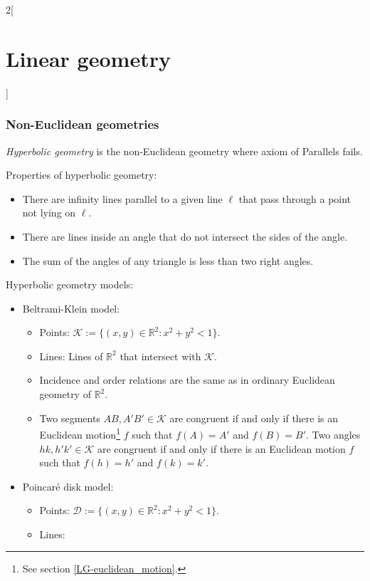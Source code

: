 \documentclass[../../../main.tex]{subfiles}
\begin{document}
\begin{multicols}{2}[\section{Linear geometry}]
\subsubsection*{Non-Euclidean geometries}
\begin{definition}
\textit{Hyperbolic geometry} is the non-Euclidean geometry where axiom of Parallels fails.
\end{definition}
\begin{prop}
Properties of hyperbolic geometry:
\begin{itemize}
    \item There are infinity lines parallel to a given line $\ell$ that pass through a point not lying on $\ell$.
    \item There are lines inside an angle that do not intersect the sides of the angle.
    \item The sum of the angles of any triangle is less than two right angles.
\end{itemize}
\end{prop}
\begin{definition}
Hyperbolic geometry models:
\begin{itemize}
    \item Beltrami-Klein model:
    \begin{itemize}
        \item Points: $\mathcal{K}:=\{(x,y)\in\mathbb{R}^2:x^2+y^2<1\}$.
        \item Lines: Lines of $\mathbb{R}^2$ that intersect with $\mathcal{K}$.
        \item Incidence and order relations are the same as in ordinary Euclidean geometry of $\mathbb{R}^2$.
        \item Two segments $AB,A'B'\in\mathcal{K}$ are congruent if and only if there is an Euclidean motion\footnote{See section \ref{LG-euclidean_motion}.} $f$ such that $f(A)=A'$ and $f(B)=B'$. Two angles $hk,h'k'\in\mathcal{K}$ are congruent if and only if there is an Euclidean motion $f$ such that $f(h)=h'$ and $f(k)=k'$.
    \end{itemize}
    \item Poincaré disk model:
    \begin{itemize}
        \item Points: $\mathcal{D}:=\{(x,y)\in\mathbb{R}^2:x^2+y^2<1\}$.
        \item Lines: 
        \begin{enumerate}

\end{enumerate}
\end{itemize}
\end{itemize}
\end{definition}
\end{multicols}
\end{document}
